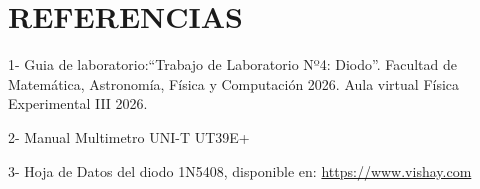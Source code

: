 \documentclass[10pt,twocolumn]{article}
\begin{document}
\section{REFERENCIAS}
1- Guia de laboratorio:“Trabajo de 
Laboratorio Nº4: Diodo”.
Facultad de Matemática, Astronomía, 
Física y Computación 2026. Aula virtual 
Física Experimental III 2026.


2- Manual Multimetro UNI-T UT39E+


3-  Hoja de Datos del diodo 1N5408, disponible en: \url{https://www.vishay.com}
\end{document}
